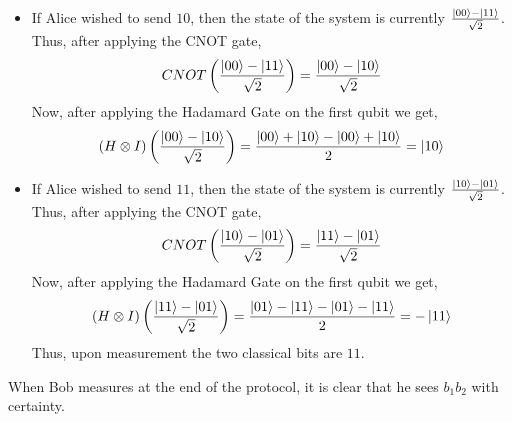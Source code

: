 \begin{enumerate}
\begin{itemize}
        \[
            (H\otimes I)\left(\frac{\ket{11}+\ket{01}}{\sqrt{2}}\right)=\frac{\ket{01}-\ket{11}+\ket{01}+\ket{11}}{2}=\ket{01}
        \]
        \item If Alice wished to send $10$, then the state of the system is currently $\frac{\ket{00}-\ket{11}}{\sqrt{2}}$. Thus, after applying the CNOT gate,
        \[
            CNOT\left(\frac{\ket{00}-\ket{11}}{\sqrt{2}}\right)=\frac{\ket{00}-\ket{10}}{\sqrt{2}}
        \]
        Now, after applying the Hadamard Gate on the first qubit we get,
        \[
            (H\otimes I)\left(\frac{\ket{00}-\ket{10}}{\sqrt{2}}\right)=\frac{\ket{00}+\ket{10}-\ket{00}+\ket{10}}{2}=\ket{10}
        \]
        \item If Alice wished to send $11$, then the state of the system is currently $\frac{\ket{10}-\ket{01}}{\sqrt{2}}$. Thus, after applying the CNOT gate,
        \[
            CNOT\left(\frac{\ket{10}-\ket{01}}{\sqrt{2}}\right)=\frac{\ket{11}-\ket{01}}{\sqrt{2}}
        \]
        Now, after applying the Hadamard Gate on the first qubit we get,
        \[
            (H\otimes I)\left(\frac{\ket{11}-\ket{01}}{\sqrt{2}}\right)=\frac{\ket{01}-\ket{11}-\ket{01}-\ket{11}}{2}=-\ket{11}
        \]
        Thus, upon measurement the two classical bits are $11$.
    \end{itemize}
    When Bob measures at the end of the protocol, it is clear that he sees $b_1b_2$ with certainty.
\end{enumerate}

